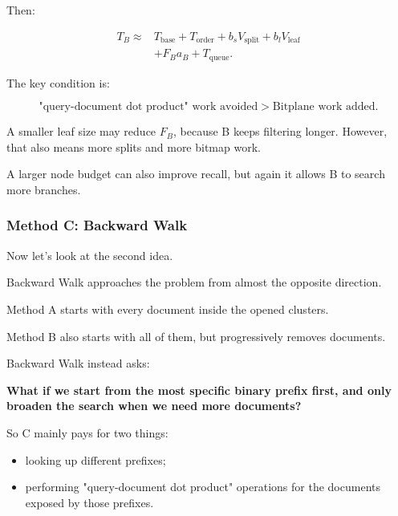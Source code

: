 Then:

\[
\boxed{\begin{aligned}T_B\approx{}&T_{\text{base}}+T_{\text{order}}+b_sV_{\text{split}}+b_lV_{\text{leaf}}\\&+F_Ba_B+T_{\text{queue}}.\end{aligned}}
\]

The key condition is:

\[
\boxed{
\text{"query-document dot product" work avoided}
>
\text{Bitplane work added}.
}
\]

A smaller leaf size may reduce \(F_B\), because B keeps filtering longer. However, that also means more splits and more bitmap work.

A larger node budget can also improve recall, but again it allows B to search more branches.

\begin{center}\setlength{\fboxsep}{9pt}\end{center}



\subsubsection{Method C: Backward Walk}
Now let's look at the second idea.

Backward Walk approaches the problem from almost the opposite direction.

Method A starts with every document inside the opened clusters.

Method B also starts with all of them, but progressively removes documents.

Backward Walk instead asks:

\textbf{What if we start from the most specific binary prefix first, and only broaden the search when we need more documents?}

So C mainly pays for two things:
\begin{itemize}\setlength{\itemsep}{1pt}
\item looking up different prefixes;
\item performing "query-document dot product" operations for the documents exposed by those prefixes.
\end{itemize}

